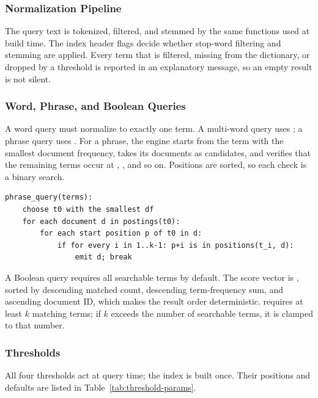 \subsubsection{Normalization Pipeline}

The query text is tokenized, filtered, and stemmed by the same functions used at
build time. The index header flags decide whether stop-word filtering and
stemming are applied. Every term that is filtered, missing from the dictionary,
or dropped by a threshold is reported in an explanatory message, so an empty
result is not silent.

\subsubsection{Word, Phrase, and Boolean Queries}

A word query must normalize to exactly one term. A multi-word query uses
; a phrase query uses . For a phrase, the engine
starts from the term with the smallest document frequency, takes its documents
as candidates, and verifies that the remaining terms occur at
, , and so on. Positions are sorted, so each check
is a binary search.

\begin{lstlisting}[style=cli]
phrase_query(terms):
    choose t0 with the smallest df
    for each document d in postings(t0):
        for each start position p of t0 in d:
            if for every i in 1..k-1: p+i is in positions(t_i, d):
                emit d; break
\end{lstlisting}

A Boolean query requires all searchable terms by default. The score vector is
, sorted by descending matched count, descending
term-frequency sum, and ascending document ID, which makes the result order
deterministic.  requires at least $k$ matching terms; if
$k$ exceeds the number of searchable terms, it is clamped to that number.

\subsubsection{Thresholds}

All four thresholds act at query time; the index is built once. Their positions
and defaults are listed in Table~\ref{tab:threshold-params}.

